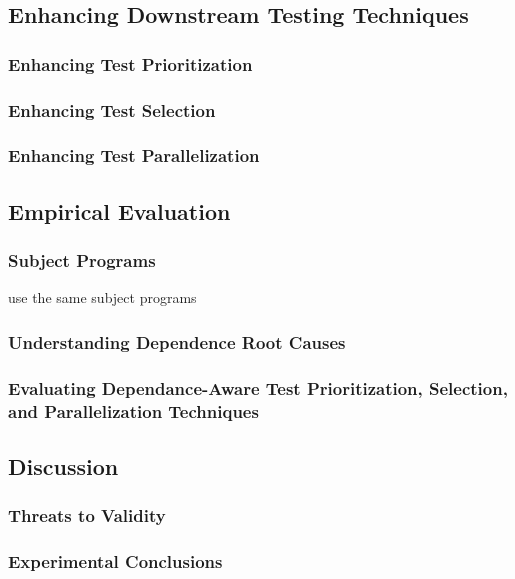 \subsection{Enhancing Downstream Testing Techniques}
\label{sec:copeenhance}

\subsubsection{Enhancing Test Prioritization}

\subsubsection{Enhancing Test Selection}

\subsubsection{Enhancing Test Parallelization}

\subsection{Empirical Evaluation}
\label{sec:evaluation}

\subsubsection{Subject Programs}

use the same subject programs

\subsubsection{Understanding Dependence Root Causes}

\subsubsection{Evaluating Dependance-Aware Test Prioritization, Selection, and Parallelization Techniques}

\subsection{Discussion}

\subsubsection{Threats to Validity}

\subsubsection{Experimental Conclusions}
